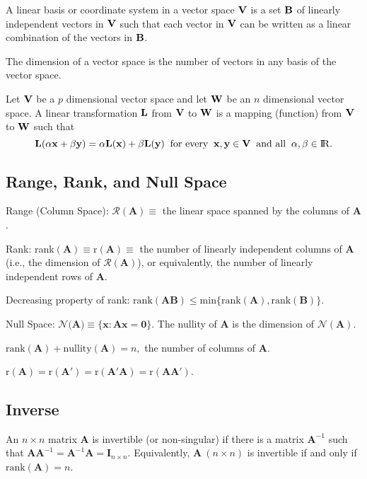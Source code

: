 \bsdefi
A linear basis or coordinate system in a vector space ${\bf V}$ is a
set ${\bf B}$ of linearly independent vectors in ${\bf V}$ such that
each vector in ${\bf V}$ can be written as a linear combination of the
vectors in ${\bf B}$.
\esdefi

\bsdefi
The dimension of a vector space is the number of vectors in any basis
of the vector space.
\esdefi

\bsdefi
Let ${\bf V}$ be a $p$ dimensional vector space and let ${\bf W}$ be
an $n$ dimensional vector space.  A linear transformation ${\bf L}$
from ${\bf V}$ to ${\bf W}$ is a mapping (function) from ${\bf V}$ to
${\bf W}$ such that
$${\bf L}(\alpha{\bf x}+\beta{\bf y})
=\alpha{\bf L}({\bf x})+\beta{\bf L}({\bf y})\;\;\mbox{for every}\;\;
{\bf x},{\bf y} \in {\bf V}\;\;\mbox{and all}\;\;\alpha, \beta \in
{\rm I\!R}.$$
\edefi


\subsection{Range, Rank, and Null Space}

\bdefi
Range (Column Space): $\mathcal R(\mathbf A) \equiv$ the linear space
spanned by the columns of $\mathbf A$.
\esdefi

\bsdefi
Rank: rank$(\mathbf A)\equiv \mathrm{r}(\mathbf A)\equiv$ the number
of linearly independent columns of $\mathbf A$ (i.e., the dimension of
$\mathcal R(\mathbf A)$), or equivalently, the number of linearly
independent rows of $\mathbf A$.
\esdefi

\btheo
Decreasing property of rank: $\mathbf{ \mathrm{rank}(AB) \leq
\mathrm{min}\{\mathrm{rank}(A), \mathrm{rank}(B)\}}.$
\estheo

\bdefi
Null Space: $\mathcal{N}(\mathbf{A)\equiv\{x: Ax=0}\}$.  The nullity
of $\mathbf A$ is the dimension of $\mathcal{N}(\mathbf{A})$.
\esdefi

\btheo
$\mathrm{rank}(\mathbf{A}) + \mathrm{nullity}(\mathbf{A}) = n,$ the
number of columns of $\mathbf A$.
\estheo

\bstheo
$\mathbf{\mathrm{r}(A) = \mathrm{r}(A') = \mathrm{r}(A'A) =
\mathrm{r}(AA')}$.
\etheo


\subsection{Inverse}

\bdefi
An $n\times n$ matrix $\mathbf{A}$ is invertible (or non-singular) if
there is a matrix $\mathbf{A}^{-1}$ such that $ \mathbf{A}
\mathbf{A}^{-1} = \mathbf{A}^{-1} \mathbf{A} = \mathbf{I}_{n\times
n}.$ Equivalently, $\mathbf{A}\ (n \times n)$ is invertible if and
only if $\mathrm{rank}(\mathbf{A})=n$.
\esdefi

